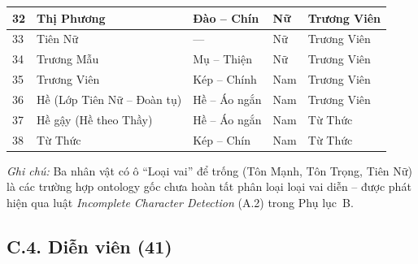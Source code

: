 \begin{longtable}{|p{0.6cm}|p{4.5cm}|p{3.0cm}|p{1.0cm}|p{4.4cm}|}
  32 & Thị Phương                               & Đào -- Chín    & Nữ  & Trương Viên           \\ \hline
  33 & Tiên Nữ                                  & ---            & Nữ  & Trương Viên           \\ \hline
  34 & Trương Mẫu                               & Mụ -- Thiện    & Nữ  & Trương Viên           \\ \hline
  35 & Trương Viên                              & Kép -- Chính   & Nam & Trương Viên           \\ \hline
  36 & Hề (Lớp Tiên Nữ -- Đoàn tụ)              & Hề -- Áo ngắn  & Nam & Trương Viên           \\ \hline
  37 & Hề gậy (Hề theo Thầy)                    & Hề -- Áo ngắn  & Nam & Từ Thức               \\ \hline
  38 & Từ Thức                                  & Kép -- Chín    & Nam & Từ Thức               \\ \hline
\end{longtable}

\textit{Ghi chú:} Ba nhân vật có ô ``Loại vai'' để trống (Tôn Mạnh, Tôn Trọng, Tiên Nữ) là các trường hợp ontology gốc chưa hoàn tất phân loại loại vai diễn -- được phát hiện qua luật \textit{Incomplete Character Detection} (A.2) trong Phụ lục~B.

\subsection*{C.4. Diễn viên (41)}

